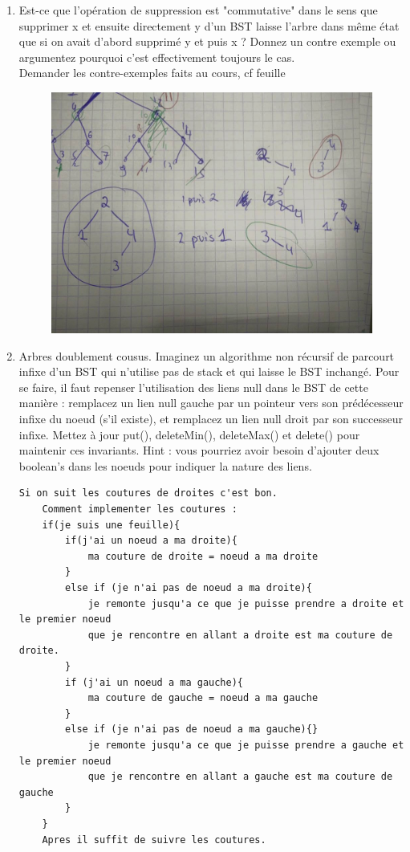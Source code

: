 \documentclass[11pt]{article}
\begin{document}
\begin{enumerate}
\item Est-ce que l’opération de suppression est "commutative" dans le sens que supprimer
x et ensuite directement y d’un BST laisse l’arbre dans même état que si on
avait d’abord supprimé y et puis x ? Donnez un contre exemple ou argumentez
pourquoi c’est effectivement toujours le cas. \\
{\color{dkgreen}Demander les contre-exemples faits au cours, cf feuille}
\begin{figure}[!h]
\centering
\includegraphics[scale=0.4]{im.jpg}
\end{figure}

\newpage
\item Arbres doublement cousus. Imaginez un algorithme non récursif de parcourt infixe
d’un BST qui n’utilise pas de stack et qui laisse le BST inchangé. Pour se faire, il
faut repenser l’utilisation des liens null dans le BST de cette manière : remplacez
un lien null gauche par un pointeur vers son prédécesseur infixe du noeud
(s’il existe), et remplacez un lien null droit par son successeur infixe. Mettez
à jour put(), deleteMin(), deleteMax() et delete() pour maintenir
ces invariants. Hint : vous pourriez avoir besoin d’ajouter deux boolean’s dans
les noeuds pour indiquer la nature des liens.\\
\begin{lstlisting}
Si on suit les coutures de droites c'est bon.
	Comment implementer les coutures : 
	if(je suis une feuille){
		if(j'ai un noeud a ma droite){
			ma couture de droite = noeud a ma droite
		}
		else if (je n'ai pas de noeud a ma droite){
			je remonte jusqu'a ce que je puisse prendre a droite et le premier noeud
			que je rencontre en allant a droite est ma couture de droite.
		}
		if (j'ai un noeud a ma gauche){
			ma couture de gauche = noeud a ma gauche
		}
		else if (je n'ai pas de noeud a ma gauche){}
			je remonte jusqu'a ce que je puisse prendre a gauche et le premier noeud
			que je rencontre en allant a gauche est ma couture de gauche
		}
	}
	Apres il suffit de suivre les coutures.
	
\end{lstlisting}
\end{enumerate}
\end{document}

